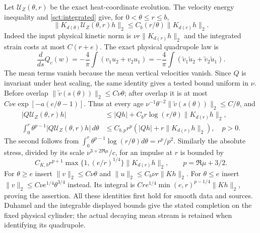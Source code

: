 Let $\mathcal U_Z(\theta,r)$ be the exact heat-coordinate evolution.
The velocity energy inequality and \eqref{sct:integrated} give,
for $0<\theta\le r\le b$,
\begin{equation}\label{eq:ct-kinetic-impulse}
 \|K_{d(\theta)}\mathcal U_Z(\theta,r)h\|_2
       \le C_b(r/\theta)\|K_{d(r)}h\|_2.
\end{equation}
Indeed the input physical kinetic norm is
$\nu r\|K_{d(r)}h\|_2$ and the integrated strain costs at most
$C(r+e)$. The exact physical quadrupole law is
\[
 \frac{d}{ds}Q_c(w)
    =-\frac4\pi\int(v_1u_2+v_2u_1)
    =-\frac4\pi\int(\widetilde v_1\widetilde u_2+
                              \widetilde v_2\widetilde u_1).
\]
The mean terms vanish because the mean vertical velocities vanish.
Since $Q$ is invariant under heat scaling, the same identity gives
a tested bound uniform in $\nu$. Before overlap
$\|\widetilde v(s(\theta))\|_2\le C\nu\theta$;
after overlap it is at most
$C\nu e\exp[-a(e/\theta-1)]$. Thus at every age
$\nu^{-1}\theta^{-2}\|\widetilde v(s(\theta))\|_2\le C/\theta$,
and
\begin{align}
 |Q\mathcal U_Z(\theta,r)h|
 &\le |Qh|+C_b r\log(r/\theta)\|K_{d(r)}h\|_2,
                      \label{eq:ct-partial-moment}\\
 \int_0^r\theta^{p-1}|Q\mathcal U_Z(\theta,r)h|\,d\theta
 &\le C_{b,p}r^p(|Qh|+r\|K_{d(r)}h\|_2),\quad p>0.
                      \label{eq:ct-tested-impulse}
\end{align}
The second follows from $\int_0^r\theta^{p-1}\log(r/\theta)d\theta=r^p/p^2$.
Similarly the absolute stress, divided by its scale
$\nu^{3+2\Re\mu}/c$, for an impulse at $r$ is bounded by
\begin{equation}\label{eq:ct-absolute-impulse}
 C_{K,b}r^{p+1}\max\{1,(e/r)^{1/4}\}\|K_{d(r)}h\|_2,
 \qquad p=\Re\mu+3/2.
\end{equation}
For $\theta\ge e$ insert $\|v\|_2\le C\nu\theta$ and
$\|u\|_2\le C_b\nu r\|Kh\|_2$. For $\theta\le e$ insert
$\|v\|_2\le C\nu e^{1/4}\theta^{3/4}$ instead. Its integral is
$Cr e^{1/4}\min(e,r)^{p-1/4}\|Kh\|_2$, proving the assertion.
All these identities first hold for smooth data and sources.
Duhamel and the integrable displayed bounds give the stated
completion on the fixed physical cylinder; the actual decaying
mean stream is retained when identifying its quadrupole.

